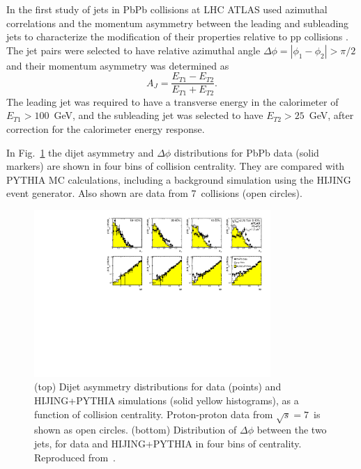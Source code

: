 In the first study of jets in PbPb collisions at LHC ATLAS used azimuthal correlations and the
momentum asymmetry between the leading and subleading jets to characterize the modification
of their properties relative to pp collisions \cite{Aad:2010bu}.
The jet pairs were selected to have relative azimuthal angle $\Delta \phi =|\phi_1-\phi_2| > \pi/2$
and their momentum asymmetry was determined as
\begin{equation}
A_J = \frac{E_{T1}-E_{T2}}{E_{T1}+E_{T2}}.
\end{equation}
The leading jet was required to have a transverse energy in the calorimeter of $E_{T1} > 100$~GeV,
and the subleading jet was selected to have $E_{T2} > 25$~GeV, after correction for
the calorimeter energy response.

In Fig.~\ref{fig:GR:final_4x2} the dijet asymmetry and $\Delta\phi$ distributions for PbPb data (solid markers)
are shown in four bins of collision centrality. They are compared with PYTHIA MC calculations, including a
background simulation using the HIJING event generator. Also shown are data from 7\TeV\
\pp collisions (open circles).
\begin{figure}[!thb]
\begin{center}
\includegraphics[width=0.8\textwidth]{jetfigures/final_4x2_23_newpp.pdf}
\caption{
(top) Dijet asymmetry distributions for data (points) and HIJING+PYTHIA simulations (solid yellow histograms),
as a function of collision centrality.  Proton-proton data from $\sqrt{s}=7$\TeV\ is shown as open circles.
(bottom) Distribution of $\Delta\phi$ between the two jets, for data and HIJING+PYTHIA in four bins of centrality.
Reproduced from~\cite{Aad:2010bu}.}
\label{fig:GR:final_4x2}
\end{center}
\end{figure}

